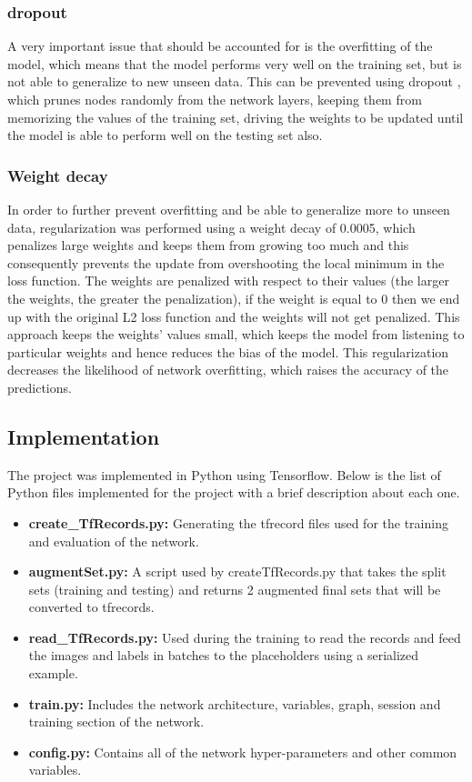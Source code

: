 \documentclass{article}
\begin{document}
\begin{adjustwidth}{-40pt}{-40pt}
\subsubsection{dropout}
A very important issue that should be accounted for is the overfitting of the model, which means that the model performs very well on the training set, but is not able to generalize to new unseen data. This can be prevented using dropout \cite{srivastava2014dropout}, which prunes nodes randomly from the network layers, keeping them from memorizing the values of the training set, driving the weights to be updated until the model is able to perform well on the testing set also.

\subsubsection{Weight decay}
In order to further prevent overfitting and be able to generalize more to unseen data, regularization \cite{DBLP:journals/corr/Laarhoven17b} was performed using a weight decay of 0.0005, which penalizes large weights and keeps them from growing too much and this consequently prevents the update from overshooting the local minimum in the loss function. The weights are penalized with respect to their values (the larger the weights, the greater the penalization), if the weight is equal to 0 then we end up with the original L2 loss function and the weights will not get penalized. This approach keeps the weights' values small, which keeps the model from listening to particular weights and hence reduces the bias of the model. This regularization decreases the likelihood of network overfitting, which raises the accuracy of the predictions.

\subsection{Implementation}

The project was implemented in Python using Tensorflow. Below is the list of Python files implemented for the project with a brief description about each one.

\begin{itemize}
    \item \textbf{create\_TfRecords.py:} Generating the tfrecord files used for the training and evaluation of the network.
    \item \textbf{augmentSet.py:} A script used by createTfRecords.py that takes the split sets (training and testing) and returns 2 augmented final sets that will be converted to tfrecords.
    \item \textbf{read\_TfRecords.py:} Used during the training to read the records and feed the images and labels in batches to the placeholders using a serialized example.
    \item \textbf{train.py:} Includes the network architecture, variables, graph,  session and training section of the network.
    \item \textbf{config.py:} Contains all of the network hyper-parameters and other common variables.


\end{itemize}
\end{adjustwidth}
\end{document}
